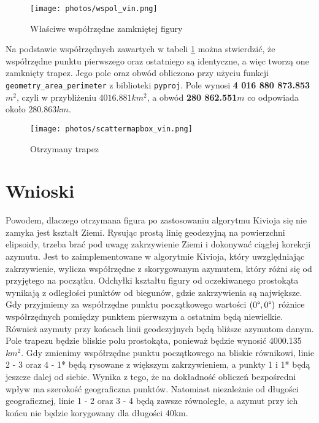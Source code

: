 \documentclass[fleqn,10pt,a4paper]{article}
\begin{document}
\begin{figure}[!h]
  \centering
  \texttt{[image: photos/wspol\_vin.png]}
  \caption{Właściwe współrzędne zamkniętej figury}
  \label{wspol:vincenty}
\end{figure}

Na podstawie współrzędnych zawartych w tabeli \ref{wspol:vincenty} można stwierdzić, że współrzędne punktu pierwszego oraz ostatniego są identyczne,
a więc tworzą one zamknięty trapez. Jego pole oraz obwód obliczono przy użyciu funkcji \texttt{geometry\_area\_perimeter} z biblioteki \texttt{pyproj}.
Pole wynosi \textbf{4 016 880 873.853 $m^2$}, czyli w przybliżeniu $4016.881 km^2$, 
a obwód \textbf{280 862.551$m$} co odpowiada około $280.863 km$. 

\begin{figure}[!h]
  \centering
  \texttt{[image: photos/scattermapbox\_vin.png]}
  \caption{Otrzymany trapez}
  \label{fig:vincenty}
\end{figure}

\section{Wnioski}

Powodem, dlaczego otrzymana figura po zastosowaniu algorytmu Kivioja się nie zamyka jest kształt Ziemi.
Rysując prostą linię geodezyjną na powierzchni elipsoidy, trzeba brać pod uwagę zakrzywienie Ziemi i dokonywać
ciągłej korekcji azymutu. Jest to zaimplementowane w algorytmie Kivioja, który uwzględniając zakrzywienie,
wylicza współrzędne z skorygowanym azymutem, który różni się od przyjętego na początku.
Odchyłki kształtu figury od oczekiwanego prostokąta wynikają z odległości punktów od biegunów, gdzie zakrzywienia są największe. 
Gdy przyjmiemy za współrzędne punktu początkowego wartości $(0 \degree, 0 \degree)$
różnice współrzędnych pomiędzy punktem pierwszym a ostatnim będą niewielkie. Również azymuty przy końcach linii geodezyjnych
będą bliższe azymutom danym. Pole trapezu będzie bliskie polu prostokąta, ponieważ będzie wynosić 4000.135 $km^2$.
Gdy zmienimy współrzędne punktu początkowego na bliskie równikowi, linie 
2 - 3 oraz 4 - 1* będą rysowane z większym zakrzywieniem, a punkty 1 i 1* będą jeszcze dalej od siebie. 
Wynika z tego, że na dokładność obliczeń bezpośredni wpływ ma szerokość geograficzna punktów.
Natomiast niezależnie od długości geograficznej, linie 1 - 2 oraz 3 - 4 będą zawsze równoległe, a azymut przy ich końcu nie będzie korygowany
dla długości 40km.
\end{document}
